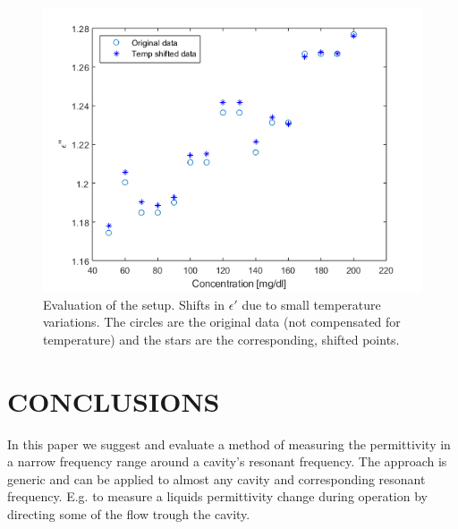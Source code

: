 \documentclass[10pt,final,conference,a4paper,twocolumn]{IEEEtran_AntennEMB_GigaHertz2016}
\begin{document}
\begin{figure}[t]
	\centering
	\includegraphics[width=1.0\columnwidth]{pumpgluzoomEIM.png}
	\caption{Evaluation of the setup. Shifts in $\epsilon'$ due to small temperature variations. The circles are the original data (not compensated for temperature) and the stars are the corresponding, shifted points.}
	\label{fig:eim}
\end{figure}





\section{CONCLUSIONS}
In this paper we suggest and evaluate a method of measuring the permittivity in a narrow frequency range around a cavity's resonant frequency. The approach is generic and can be applied to almost any cavity and corresponding resonant frequency. E.g. to measure a liquids permittivity change during operation by directing some of the flow trough the cavity.
\end{document}
